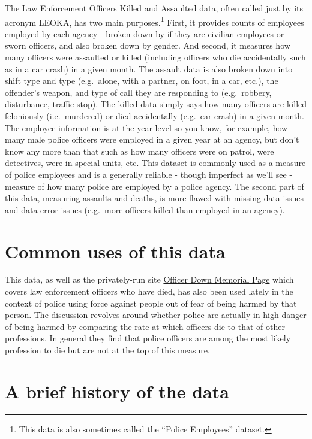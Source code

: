 \documentclass[
  12pt,
  openany]{book}
\begin{document}
The Law Enforcement Officers Killed and Assaulted data, often called just by its acronym LEOKA, has two main purposes.\footnote{This data is also sometimes called the ``Police Employees'' dataset.} First, it provides counts of employees employed by each agency - broken down by if they are civilian employees or sworn officers, and also broken down by gender. And second, it measures how many officers were assaulted or killed (including officers who die accidentally such as in a car crash) in a given month. The assault data is also broken down into shift type and type (e.g.~alone, with a partner, on foot, in a car, etc.), the offender's weapon, and type of call they are responding to (e.g.~robbery, disturbance, traffic stop). The killed data simply says how many officers are killed feloniously (i.e.~murdered) or died accidentally (e.g.~car crash) in a given month. The employee information is at the year-level so you know, for example, how many male police officers were employed in a given year at an agency, but don't know any more than that such as how many officers were on patrol, were detectives, were in special units, etc. This dataset is commonly used as a measure of police employees and is a generally reliable - though imperfect as we'll see - measure of how many police are employed by a police agency. The second part of this data, measuring assaults and deaths, is more flawed with missing data issues and data error issues (e.g.~more officers killed than employed in an agency).

\hypertarget{common-uses-of-this-data}{%
\section{Common uses of this data}\label{common-uses-of-this-data}}

This data, as well as the privately-run site \href{https://www.odmp.org/}{Officer Down Memorial Page} which covers law enforcement officers who have died, has also been used lately in the context of police using force against people out of fear of being harmed by that person. The discussion revolves around whether police are actually in high danger of being harmed by comparing the rate at which officers die to that of other professions. In general they find that police officers are among the most likely profession to die but are not at the top of this measure.

\hypertarget{a-brief-history-of-the-data-1}{%
\section{A brief history of the data}\label{a-brief-history-of-the-data-1}}
\end{document}
